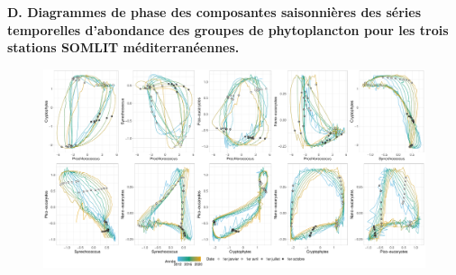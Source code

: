 \documentclass[12pt]{article}
\renewcommand{\thepage}{}
\begin{document}
\begin{appendices}
\newpage

\begin{landscape}
{\bfseries D. Diagrammes de phase des composantes saisonnières des séries temporelles d'abondance des groupes de phytoplancton pour les trois stations SOMLIT méditerranéennes.\\}
 \begin{figure}
\includegraphics[height=.75\textwidth]{fig/R15_diag_phase_banyuls.pdf}
\end{figure}
\end{landscape}

\end{appendices}

\newpage 
\renewcommand{\thepage}{}

\begin{abstract}

\end{abstract}
\end{document}
